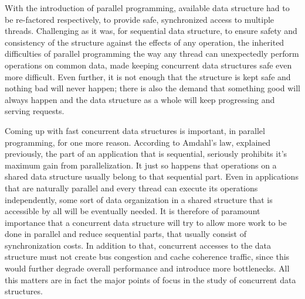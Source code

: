With the introduction of parallel programming,  available data structure had to be re-factored respectively, to provide safe, synchronized access to multiple threads. Challenging as it was, for sequential data structure, to ensure safety and consistency of the structure against the effects of any operation, the inherited difficulties of parallel programming the way any thread can unexpectedly perform operations on common data, made keeping concurrent data structures safe even more difficult. Even further, it is not enough that the structure is kept safe and nothing bad will never happen; there is also the demand that something good will always happen and the data structure as a whole will keep progressing and serving requests. 

Coming up with fast concurrent data structures is  important, in parallel programming, for one more reason. According to Amdahl's law, explained previously, the part of an application that is sequential, seriously prohibits it's maximum gain from parallelization. It just so happens that operations on a shared data structure usually belong to that sequential part. Even in applications that are naturally parallel and every thread can execute its operations independently, some sort of data organization in a shared structure that is accessible by all will be eventually needed.  It is therefore of paramount importance that a concurrent data structure will try to allow more work to be done in parallel and reduce sequential parts, that usually consist of synchronization costs. In addition to that, concurrent accesses to the data structure must not create bus congestion and cache coherence traffic, since this would further degrade overall performance and introduce more bottlenecks. All this matters are in fact the major points of focus in the study of concurrent data structures. %




